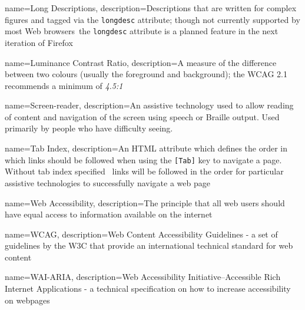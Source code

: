 {
    name=Long Descriptions,
    description=Descriptions that are written for complex figures and tagged via the \texttt{longdesc} attribute; though not currently supported by most Web browsers\, the \texttt{longdesc} attribute is a planned feature in the next iteration of Firefox
}

{
    name=Luminance Contrast Ratio,
    description=A measure of the difference between two colours (usually the foreground and background); the WCAG 2.1 recommends a minimum of \textit{4.5:1}
}

{
    name=Screen-reader,
    description=An assistive technology used to allow reading of content and navigation of the screen using speech or Braille output. Used primarily by people who have difficulty seeing.
}

{
    name=Tab Index,
    description=An HTML attribute which defines the order in which links should be followed when using the \texttt{[Tab]} key to navigate a page. Without tab index specified \, links will be followed in the order for particular assistive technologies to successfully navigate a web page
}

{
    name=Web Accessibility,
    description=The principle that all web users should have equal access to information available on the internet
}

{
    name=WCAG,
    description=Web Content Accessibility Guidelines - a set of guidelines by the W3C that provide an international technical standard for web content
}

{
    name=WAI-ARIA,
    description=Web Accessibility Initiative–Accessible Rich Internet Applications - a technical specification on how to increase accessibility on webpages
}